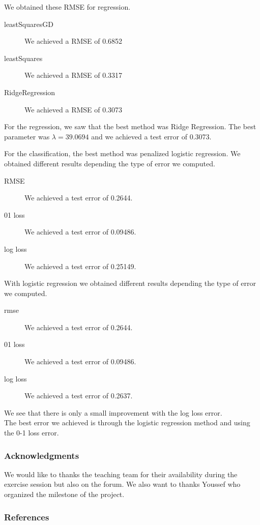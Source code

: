 \documentclass{article} %
\begin{document}
We obtained these RMSE for regression.
\begin{description}
\item[leastSquaresGD] We achieved a RMSE of 0.6852
\item[leastSquares] We achieved a RMSE of 0.3317
\item[RidgeRegression] We achieved a RMSE of 0.3073
\end{description}
For the regression, we saw that the best method was Ridge Regression. The best parameter was $\lambda =  39.0694$ and we achieved a test error of 0.3073.

For the classification, the best method was penalized logistic regression. We obtained different results depending the type of error we computed. \begin{description}
\item[RMSE] We achieved a test error of 0.2644.
\item[01 loss]We achieved a test error of 0.09486.
\item[log loss] We achieved a test error of 0.25149.
\end{description}
With logistic regression we obtained different results depending the type of error we computed. \begin{description}
\item[rmse] We achieved a test error of 0.2644.
\item[01 loss]We achieved a test error of 0.09486.
\item[log loss] We achieved a test error of 0.2637.
\end{description}
We see that there is only a small improvement with the log loss error.\\
The best error we achieved is through the logistic regression method and using the 0-1 loss error.

\subsubsection*{Acknowledgments}
We would like to thanks the teaching team for their availability during the exercise session but also on the forum. We also want to thanks Youssef who organized the milestone of the project.

\subsubsection*{References}
\end{document}

